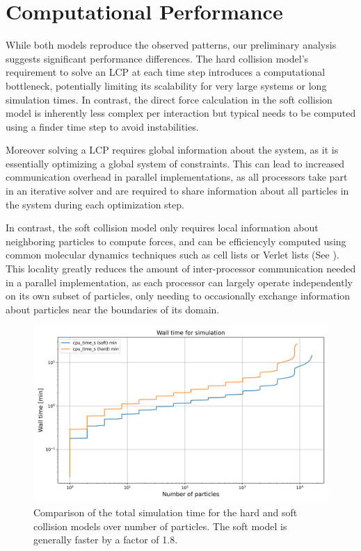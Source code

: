 \documentclass[conference]{IEEEtran}
\begin{document}
\section{Computational Performance}

While both models reproduce the observed patterns, our preliminary analysis suggests significant performance differences. The hard collision model's requirement to solve an LCP at each time step introduces a computational bottleneck, potentially limiting its scalability for very large systems or long simulation times. In contrast, the direct force calculation in the soft collision model is inherently less complex per interaction but typical needs to be computed using a finder time step to avoid instabilities.


Moreover solving a LCP requires global information about the system, as it is essentially optimizing a global system of constraints. This can lead to increased communication overhead in parallel implementations, as all processors take part in an iterative solver and are required to share information about all particles in the system during each optimization step.


In contrast, the soft collision model only requires local information about neighboring particles to compute forces, and can be efficiencyly computed using common molecular dynamics techniques such as cell lists or Verlet lists (See \cite{Gratl2019}). This locality greatly reduces the amount of inter-processor communication needed in a parallel implementation, as each processor can largely operate independently on its own subset of particles, only needing to occasionally exchange information about particles near the boundaries of its domain.


\begin{figure}
    \centering
    \includegraphics[width=\linewidth]{figures/comparisons/wall_time_simulation.png}
    \caption{Comparison of the total simulation time for the hard and soft collision models over number of particles. The soft model is generally faster by a factor of 1.8.}
    \label{figure:wall_time_simulation}
\end{figure}
\end{document}

